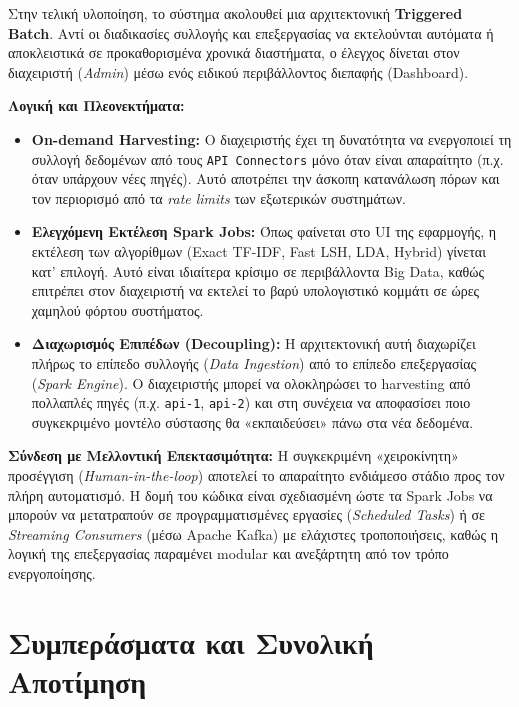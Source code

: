 \documentclass[a4paper,12pt]{article}
\begin{document}
Στην τελική υλοποίηση, το σύστημα ακολουθεί μια αρχιτεκτονική \textbf{Triggered Batch}. Αντί οι διαδικασίες συλλογής και επεξεργασίας να εκτελούνται αυτόματα ή αποκλειστικά σε προκαθορισμένα χρονικά διαστήματα, ο έλεγχος δίνεται στον διαχειριστή (\textit{Admin}) μέσω ενός ειδικού περιβάλλοντος διεπαφής (Dashboard).

\textbf{Λογική και Πλεονεκτήματα:}
\begin{itemize}
    \item \textbf{On-demand Harvesting:} Ο διαχειριστής έχει τη δυνατότητα να ενεργοποιεί τη συλλογή δεδομένων από τους \texttt{API Connectors} μόνο όταν είναι απαραίτητο (π.χ. όταν υπάρχουν νέες πηγές). Αυτό αποτρέπει την άσκοπη κατανάλωση πόρων και τον περιορισμό από τα \textit{rate limits} των εξωτερικών συστημάτων.
    
    \item \textbf{Ελεγχόμενη Εκτέλεση Spark Jobs:} Όπως φαίνεται στο UI της εφαρμογής, η εκτέλεση των αλγορίθμων (Exact TF-IDF, Fast LSH, LDA, Hybrid) γίνεται κατ' επιλογή. Αυτό είναι ιδιαίτερα κρίσιμο σε περιβάλλοντα Big Data, καθώς επιτρέπει στον διαχειριστή να εκτελεί το βαρύ υπολογιστικό κομμάτι σε ώρες χαμηλού φόρτου συστήματος.
    
    \item \textbf{Διαχωρισμός Επιπέδων (Decoupling):} Η αρχιτεκτονική αυτή διαχωρίζει πλήρως το επίπεδο συλλογής (\textit{Data Ingestion}) από το επίπεδο επεξεργασίας (\textit{Spark Engine}). Ο διαχειριστής μπορεί να ολοκληρώσει το harvesting από πολλαπλές πηγές (π.χ. \texttt{api-1}, \texttt{api-2}) και στη συνέχεια να αποφασίσει ποιο συγκεκριμένο μοντέλο σύστασης θα «εκπαιδεύσει» πάνω στα νέα δεδομένα.
\end{itemize}

\textbf{Σύνδεση με Μελλοντική Επεκτασιμότητα:}
Η συγκεκριμένη «χειροκίνητη» προσέγγιση (\textit{Human-in-the-loop}) αποτελεί το απαραίτητο ενδιάμεσο στάδιο προς τον πλήρη αυτοματισμό. Η δομή του κώδικα είναι σχεδιασμένη ώστε τα Spark Jobs να μπορούν να μετατραπούν σε προγραμματισμένες εργασίες (\textit{Scheduled Tasks}) ή σε \textit{Streaming Consumers} (μέσω Apache Kafka) με ελάχιστες τροποποιήσεις, καθώς η λογική της επεξεργασίας παραμένει modular και ανεξάρτητη από τον τρόπο ενεργοποίησης.


\section{Συμπεράσματα και Συνολική Αποτίμηση}
\end{document}
